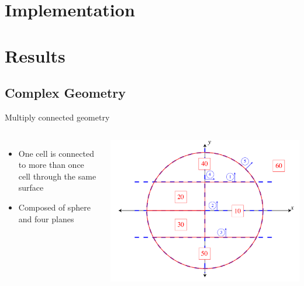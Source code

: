\documentclass{beamer}
\begin{document}
\section{Implementation}
\section{Results}
\subsection{Complex Geometry}
\begin{frame}{Multiply connected geometry}
\begin{columns}[c]
\begin{itemize}
  \item One cell is connected to more than once cell through the same surface
  \item Composed of sphere and four planes
\end{itemize}

    \includegraphics[width=\textwidth, keepaspectratio]{test_geom_1}
\end{columns}
\end{frame}
\end{document}
